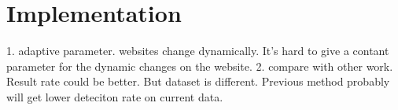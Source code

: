 \section{Implementation}
\label{s:implementation}
1. adaptive parameter. websites change dynamically. It's hard to give a contant  parameter for the dynamic changes on the website.
2. compare with other work. Result rate could be better. But dataset is different. Previous method probably will get lower deteciton rate on current data. 
